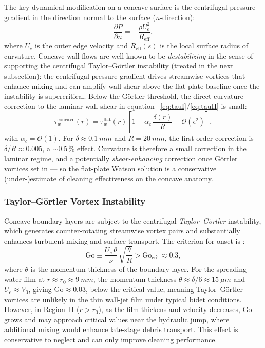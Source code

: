 \documentclass[10pt,letterpaper]{article}
\newcommand{\Go}{\mathrm{G\ddot{o}}}
\newcommand{\order}[1]{\mathcal{O}\!\left(#1\right)}
\begin{document}
The key dynamical modification on a concave surface is the centrifugal
pressure gradient in the direction normal to the surface ($n$-direction):
\begin{equation}
    \frac{\partial P}{\partial n} = -\frac{\rho U_e^2}{R_\mathrm{eff}},
    \label{eq:centrifugal}
\end{equation}
where $U_e$ is the outer edge velocity and $R_\mathrm{eff}(s)$ is the
local surface radius of curvature. Concave-wall flows are well known to be
\emph{destabilizing} in the sense of supporting the centrifugal
Taylor--G\"ortler instability (treated in the next subsection): the
centrifugal pressure gradient drives streamwise vortices that enhance
mixing and can amplify wall shear above the flat-plate baseline once
the instability is supercritical. Below the G\"ortler threshold, the
direct curvature correction to the laminar wall shear in equation~%
\eqref{eq:tauI}/\eqref{eq:tauII} is small:
\begin{equation}
    \tau_w^\mathrm{concave}(r) = \tau_w^\mathrm{flat}(r)
    \left[1 + \alpha_c\,\frac{\delta(r)}{R} + \mathcal{O}(\epsilon^2)\right],
    \label{eq:curvaturecorrection}
\end{equation}
with $\alpha_c = \order{1}$. For $\delta \approx 0.1~mm$ and
$R = 20~mm$, the first-order correction is $\delta/R \approx 0.005$,
a $\sim$0.5\,\% effect. Curvature is therefore a small correction in the
laminar regime, and a potentially \emph{shear-enhancing} correction once
G\"ortler vortices set in --- so the flat-plate Watson solution is a
conservative (under-)estimate of cleaning effectiveness on the concave
anatomy.

\subsubsection{Taylor--G\"ortler Vortex Instability}

Concave boundary layers are subject to the centrifugal \emph{Taylor--G\"ortler}
instability, which generates counter-rotating streamwise vortex pairs and
substantially enhances turbulent mixing and surface transport. The criterion
for onset is \citep{Hall1982}:
\begin{equation}
    \Go \equiv \frac{U_e\,\theta}{\nu}\,\sqrt{\frac{\theta}{R}} > \Go_\mathrm{crit}
    \approx 0.3,
    \label{eq:goertler}
\end{equation}
where $\theta$ is the momentum thickness of the boundary layer. For the
spreading water film at $r \approx r_0 \approx 9~mm$, the momentum
thickness $\theta \approx \delta/6 \approx 15~\mu  m$ and
$U_e \approx V_0$, giving $\Go \approx 0.03$, below the critical value,
meaning Taylor--G\"ortler vortices are unlikely in the thin wall-jet film
under typical bidet conditions. However, in Region~II ($r > r_0$), as the
film thickens and velocity decreases, $\Go$ grows and may approach critical
values near the hydraulic jump, where additional mixing would enhance late-stage
debris transport. This effect is conservative to neglect and can only improve
cleaning performance.
\end{document}
